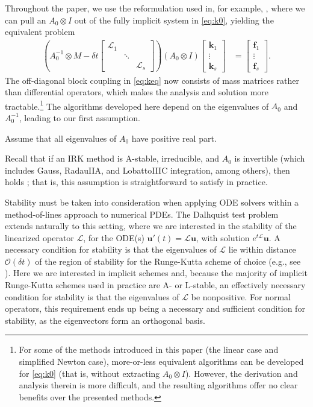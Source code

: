 \documentclass[review]{siamart}
\begin{document}
Throughout the paper, we use the reformulation used in, for example,
\cite{pazner17}, where we can pull an $A_0\otimes I$ out of the
fully implicit system in \eqref{eq:k0}, yielding the equivalent problem
%
\begin{align}\label{eq:keq}
\left( A_0^{-1}\otimes M - \delta t \begin{bmatrix} \mathcal{L}_1  & \\ & \ddots \\ && \mathcal{L}_s\end{bmatrix}\right)
	(A_0\otimes I)	\begin{bmatrix} \mathbf{k}_1 \\ \vdots \\ \mathbf{k}_s \end{bmatrix} 
& = \begin{bmatrix} \mathbf{f}_1 \\ \vdots \\ \mathbf{f}_s \end{bmatrix}.
\end{align}
%
The off-diagonal block coupling in \eqref{eq:keq} now consists of mass matrices
rather than differential operators, which makes the analysis and solution more
tractable.\footnote{For some of the methods introduced in this paper (the linear case
and simplified Newton case), more-or-less equivalent algorithms can be developed
for \eqref{eq:k0} (that is, without extracting $A_0\otimes I$). However, 
the derivation and analysis therein is more difficult, and the resulting
algorithms offer no clear benefits over the presented methods.}
The algorithms developed here depend on the eigenvalues of $A_0$ and
$A_0^{-1}$, leading to our first assumption.
%
\begin{assumption}\label{ass:eig}
Assume that all eigenvalues of $A_0$ have positive real part.
\end{assumption}
%
Recall that if an IRK method is A-stable, irreducible, and $A_0$ is invertible
(which includes Gauss, RadauIIA, and LobattoIIIC integration, among others), 
then  holds \cite{hairer96}; that is, this assumption is 
straightforward to satisfy in practice. 

Stability must be taken into consideration when applying ODE solvers within a
method-of-lines approach to numerical PDEs. The Dalhquist test problem extends
naturally to this setting, where we are interested in the stability of the
linearized operator $\mathcal{L}$, for the ODE(s)
$\mathbf{u}'(t) = \mathcal{L}\mathbf{u}$, with solution $e^{t\mathcal{L}}\mathbf{u}$.
A necessary condition for stability is that the eigenvalues of $\mathcal{L}$
lie within distance $\mathcal{O}(\delta t)$ of the region of stability for 
the Runge-Kutta scheme of choice (e.g., see \cite{reddy92}). Here we are
interested in implicit schemes and, because the majority of implicit Runge-Kutta schemes
used in practice are A- or L-stable, an effectively necessary condition for
stability is that the eigenvalues of $\mathcal{L}$ be nonpositive. For
normal operators, this requirement ends up being a necessary and sufficient
condition for stability, as the eigenvectors form an orthogonal basis. 
\end{document}
